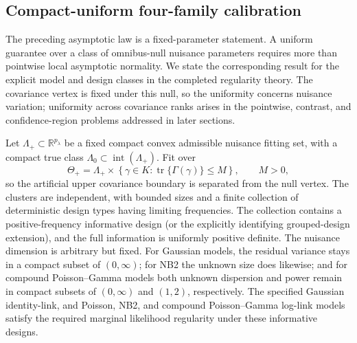 \subsection{Compact-uniform four-family calibration}
\label{subsec:sec5-uniform-omnibus}
The preceding asymptotic law is a fixed-parameter statement. A
uniform guarantee over a class of omnibus-null nuisance parameters
requires more than pointwise local asymptotic normality. We state the
corresponding result for the explicit model and design classes in the
completed regularity theory. The covariance vertex is fixed under this
null, so the uniformity concerns nuisance variation; uniformity across
covariance ranks arises in the pointwise, contrast, and confidence-region
problems addressed in later sections.

Let $\Lambda_+\subset\mathbb R^{p_\lambda}$ be a fixed compact convex
admissible nuisance fitting set, with a compact true class
$\Lambda_0\subset\operatorname{int}(\Lambda_+)$. Fit over
\begin{equation}\label{eq:sec5-compact-fit}
\Theta_+=\Lambda_+\times
\left\{\gamma\in K:
\operatorname{tr}\{\Gamma(\gamma)\}\leq M\right\},
\qquad M>0,
\end{equation}
so the artificial upper covariance boundary is separated from the
null vertex. The clusters are independent, with bounded sizes and a
finite collection of deterministic design types having limiting
frequencies. The collection contains a positive-frequency informative
design (or the explicitly identifying grouped-design extension), and
the full information is uniformly positive definite. The nuisance
dimension is arbitrary but fixed. For Gaussian models, the residual
variance stays in a compact subset of $(0,\infty)$; for NB2 the
unknown size does likewise; and for compound Poisson--Gamma models
both unknown dispersion and power remain in compact subsets of
$(0,\infty)$ and $(1,2)$, respectively. The specified Gaussian
identity-link, and Poisson, NB2, and compound Poisson--Gamma log-link
models satisfy the required marginal likelihood regularity under
these informative designs.

